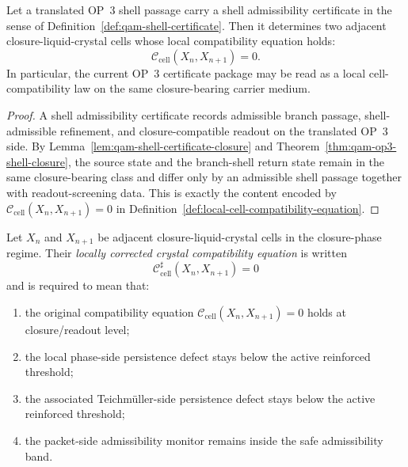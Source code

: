 \begin{proposition}
\label{prop:op3-cell-compatibility-reading}
Let a translated OP~3 shell passage carry a shell admissibility certificate in the sense of Definition~\ref{def:qam-shell-certificate}. Then it determines two adjacent closure-liquid-crystal cells whose local compatibility equation holds:
\[
  \mathcal C_{\mathrm{cell}}(X_n,X_{n+1})=0.
\]
In particular, the current OP~3 certificate package may be read as a local cell-compatibility law on the same closure-bearing carrier medium.
\end{proposition}

\begin{proof}
A shell admissibility certificate records admissible branch passage, shell-admissible refinement, and closure-compatible readout on the translated OP~3 side. By Lemma~\ref{lem:qam-shell-certificate-closure} and Theorem~\ref{thm:qam-op3-shell-closure}, the source state and the branch-shell return state remain in the same closure-bearing class and differ only by an admissible shell passage together with readout-screening data. This is exactly the content encoded by $\mathcal C_{\mathrm{cell}}(X_n,X_{n+1})=0$ in Definition~\ref{def:local-cell-compatibility-equation}.
\end{proof}

\begin{definition}
\label{def:locally-corrected-crystal-compatibility-equation}
Let $X_n$ and $X_{n+1}$ be adjacent closure-liquid-crystal cells in the closure-phase regime. Their \emph{locally corrected crystal compatibility equation} is written
\[
  \mathcal C_{\mathrm{cell}}^{\sharp}(X_n,X_{n+1})=0
\]
and is required to mean that:
\begin{enumerate}[leftmargin=2em,label=(\roman*)]
  \item the original compatibility equation $\mathcal C_{\mathrm{cell}}(X_n,X_{n+1})=0$ holds at closure/readout level;
  \item the local phase-side persistence defect stays below the active reinforced threshold;
  \item the associated Teichmüller-side persistence defect stays below the active reinforced threshold;
  \item the packet-side admissibility monitor remains inside the safe admissibility band.
\end{enumerate}
\end{definition}

